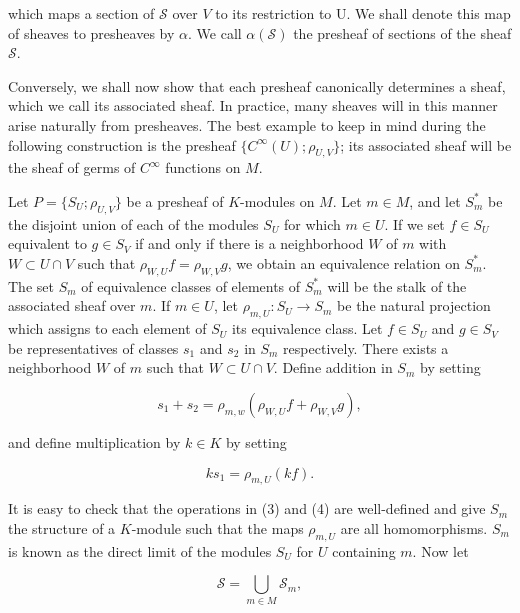 which maps a section of $\mathcal{S}$ over $V$ to its restriction to U. We shall denote this map of sheaves to presheaves by $\alpha$. We call $\alpha(\mathcal{S})$ the presheaf of sections of the sheaf $\mathcal{S}$.

Conversely, we shall now show that each presheaf canonically determines a sheaf, which we call its associated sheaf. In practice, many sheaves will in this manner arise naturally from presheaves. The best example to keep in mind during the following construction is the presheaf  $ \{C^\infty(U);\rho_{U,V}\} $; its associated sheaf will be the sheaf of germs of  $ C^\infty $ functions on  $ M $.

Let $P = \{S_U; \rho_{U,V}\}$ be a presheaf of $K$-modules on $M$. Let $m \in M$, and let $S_m^*$ be the disjoint union of each of the modules $S_U$ for which $m \in U$. If we set $f \in S_U$ equivalent to $g \in S_V$ if and only if there is a neighborhood $W$ of $m$ with $W \subset U \cap V$ such that $\rho_{W,U}f = \rho_{W,V}g$, we obtain an equivalence relation on $S_m^*$. The set $S_m$ of equivalence classes of elements of $S_m^*$ will be the stalk of the associated sheaf over $m$. If $m \in U$, let $\rho_{m,U}: S_U \to S_m$ be the natural projection which assigns to each element of $S_U$ its equivalence class. Let $f \in S_U$ and $g \in S_V$ be representatives of classes $s_1$ and $s_2$ in $S_m$ respectively. There exists a neighborhood $W$ of $m$ such that $W \subset U \cap V$. Define addition in $S_m$ by setting

\begin{equation}
\tag{3}\label{eq:5.6:3}
s_{1}+s_{2}=\rho_{m,w}(\rho_{W,U}f+\rho_{W,V}g),
\end{equation}

and define multiplication by  $ k \in K $ by setting

\begin{equation}
\tag{4}\label{eq:5.6:4}
k s_{1}=\rho_{m,U}(k f).
\end{equation}

It is easy to check that the operations in (3) and (4) are well-defined and give $S_{m}$ the structure of a $K$-module such that the maps $\rho_{m,U}$ are all homomorphisms. $S_{m}$ is known as the direct limit of the modules $S_{U}$ for $U$ containing $m$. Now let 

\begin{equation}
\tag{5}\label{eq:5.6:5}
\mathcal{S}=\bigcup_{m\in M}\mathcal{S}_{m},
\end{equation}

